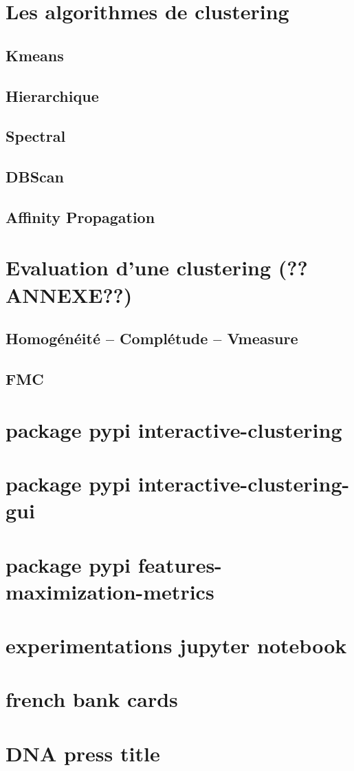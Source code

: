 \Annexes


    \section{Les algorithmes de clustering }

        \subsection{Kmeans}
        \subsection{Hierarchique}
        \subsection{Spectral}
        \subsection{DBScan}
        \subsection{Affinity Propagation}

    \section{Evaluation d’une clustering (??ANNEXE??)}

        \subsection{Homogénéité – Complétude – Vmeasure}
        \subsection{FMC}


    \section{package pypi interactive-clustering}
    \section{package pypi interactive-clustering-gui}
    \section{package pypi features-maximization-metrics}
    \section{experimentations jupyter notebook}


    \section{french bank cards}
    \section{DNA press title}
